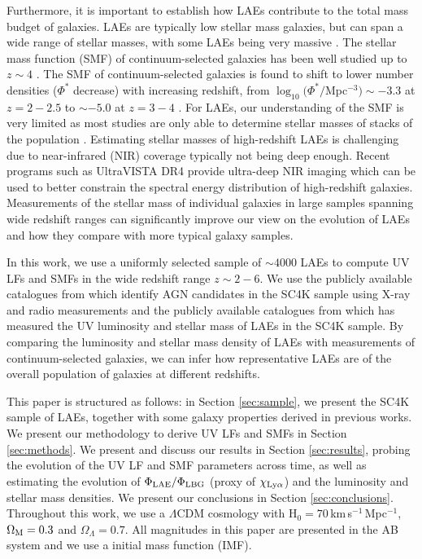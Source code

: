 \documentclass[a4paper,fleqn,usenatbib]{mnras}
\begin{document}
Furthermore, it is important to establish how LAEs contribute to the total mass budget of galaxies. LAEs are typically low stellar mass galaxies, but can span a wide range of stellar masses, with some LAEs being very massive \citep[$\rm>10^{10}\,M_\odot$, e.g.][]{Finkelstein2009}. The stellar mass function (SMF) of continuum-selected galaxies has been well studied up to $z\sim4$ \citep[see e.g.][]{Pozzetti2010,Mortlock2011,Santini2012,Ilbert2013,Muzzin2013}. The SMF of continuum-selected galaxies is found to shift to lower number densities ($\Phi^*$ decrease) with increasing redshift, from $\log_{10}(\Phi^*/$Mpc$^{-3})\sim-3.3$ at $z=2-2.5$ to $\sim-5.0$ at $z=3-4$ \citep{Muzzin2013}. For LAEs, our understanding of the SMF is very limited as most studies are only able to determine stellar masses of stacks of the population \citep[e.g.][]{Kusakabe2018}. Estimating stellar masses of high-redshift LAEs is challenging due to near-infrared (NIR) coverage typically not being deep enough. Recent programs such as UltraVISTA \citep{McCracken2012} DR4 provide ultra-deep NIR imaging which can be used to better constrain the spectral energy distribution of high-redshift galaxies. Measurements of the stellar mass of individual galaxies in large samples spanning wide redshift ranges can significantly improve our view on the evolution of LAEs and how they compare with more typical galaxy samples.

In this work, we use a uniformly selected sample of $\sim4000$ LAEs \citep[SC4K,][]{Sobral2018} to compute UV LFs and SMFs in the wide redshift range $z\sim2-6$. We use the publicly available catalogues from \cite{Calhau2020} which identify AGN candidates in the SC4K sample using X-ray and radio measurements and the publicly available catalogues from \cite{Santos2020} which has measured the UV luminosity and stellar mass of LAEs in the SC4K sample. By comparing the luminosity and stellar mass density of LAEs with measurements of continuum-selected galaxies, we can infer how representative LAEs are of the overall population of galaxies at different redshifts.

This paper is structured as follows: in Section \ref{sec:sample}, we present the SC4K sample of LAEs, together with some galaxy properties derived in previous works. We present our methodology to derive UV LFs and SMFs in Section \ref{sec:methods}. We present and discuss our results in Section \ref{sec:results}, probing the evolution of the UV LF and SMF parameters across time, as well as estimating the evolution of $\Phi_{\rm LAE}/\Phi_{\rm LBG}$ (proxy of $\chi_{\rm Ly\alpha}$) and the luminosity and stellar mass densities. We present our conclusions in Section \ref{sec:conclusions}. Throughout this work, we use a $\Lambda$CDM cosmology with H$_0 = 70$\,km\,s$^{-1}$\,Mpc$^{-1}$, $\Omega_{\rm M} = 0.3$ and $\Omega _\Lambda = 0.7$. All magnitudes in this paper are presented in the AB system \citep{Oke1983} and we use a \citet{Chabrier2003} initial mass function (IMF).
\end{document}
